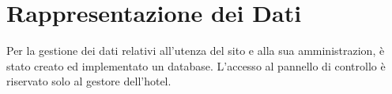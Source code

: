 \section{Rappresentazione dei Dati}
Per la gestione dei dati relativi all'utenza del sito e alla sua amministrazion, è stato creato ed implementato un database. L'accesso al pannello di controllo è riservato solo al gestore dell'hotel.